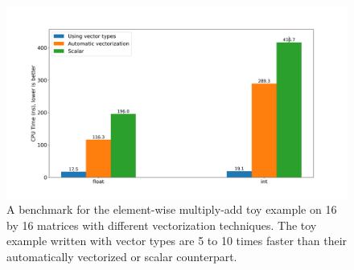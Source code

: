 \documentclass[logo,bsc,singlespacing,parskip]{infthesis}
\newcommand{\dtint}{\texttt{int32\char`_t}}
\newcommand{\dtfloat}{\texttt{float}}
\begin{document}
\begin{figure}[H]%
    \begin{center}
    \includegraphics[width=\linewidth]{image/plot_vectorization_method.png}
    \end{center}
    \caption{A benchmark for the element-wise multiply-add toy example on 16
        by 16 matrices with different vectorization techniques. The toy example
        written with vector types are 5 to 10 times faster than their
        automatically vectorized or scalar counterpart. 
    }
    \label{plot_vectorization_method}
\end{figure}
\end{document}
